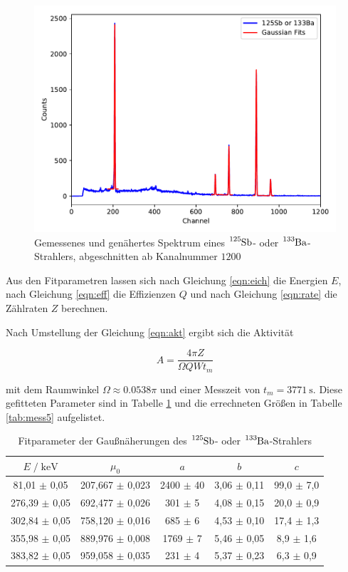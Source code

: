 \begin{figure}
  \centering
  \includegraphics[scale=0.7]{content/plot3.pdf}
  \caption{Gemessenes und genähertes Spektrum eines $\ce{^{125}Sb}$- oder  $\ce{^{133}Ba}$-Strahlers,
           abgeschnitten ab Kanalnummer $\num{1200}$}
  \label{fig:plot3}
\end{figure}

Aus den Fitparametren lassen sich nach Gleichung \eqref{eqn:eich} die Energien $E$, nach Gleichung \eqref{eqn:eff} 
die Effizienzen $Q$ und nach Gleichung \eqref{eqn:rate} die Zählraten $Z$ berechnen.

Nach Umstellung der Gleichung \eqref{eqn:akt} ergibt sich die Aktivität

\begin{equation}
  A = \frac{4 \pi Z}{\Omega Q W t_m}
\end{equation}

mit dem Raumwinkel $\Omega \approx \num{0.0538} \pi$ und einer Messzeit von $t_m = \SI{3771}{\second}$.
Diese gefitteten Parameter sind in Tabelle \ref{tab:mess4} und die errechneten Größen in Tabelle \ref{tab:mess5} aufgelistet.

\begin{table}
  \centering
  \caption{Fitparameter der Gaußnäherungen des $\ce{^{125}Sb}$- oder $\ce{^{133}Ba}$-Strahlers}
  \label{tab:mess4}
  \begin{tabular}{c c c c c}
  \toprule
  $E \;/\; \si{\kilo\eV}$ & $\mu_0$ & $a$ & $b$ & $c$ \\
  \midrule
     81,01 $\pm$ 0,05 & 207,667 $\pm$ 0,023 & 2400 $\pm$ 40 & 3,06 $\pm$ 0,11 & 99,0 $\pm$ 7,0 \\
    276,39 $\pm$ 0,05 & 692,477 $\pm$ 0,026 &  301 $\pm$  5 & 4,08 $\pm$ 0,15 & 20,0 $\pm$ 0,9 \\
    302,84 $\pm$ 0,05 & 758,120 $\pm$ 0,016 &  685 $\pm$  6 & 4,53 $\pm$ 0,10 & 17,4 $\pm$ 1,3 \\
    355,98 $\pm$ 0,05 & 889,976 $\pm$ 0,008 & 1769 $\pm$  7 & 5,46 $\pm$ 0,05 &  8,9 $\pm$ 1,6 \\
    383,82 $\pm$ 0,05 & 959,058 $\pm$ 0,035 &  231 $\pm$  4 & 5,37 $\pm$ 0,23 &  6,3 $\pm$ 0,9 \\
  \bottomrule
  \end{tabular}
\end{table}

